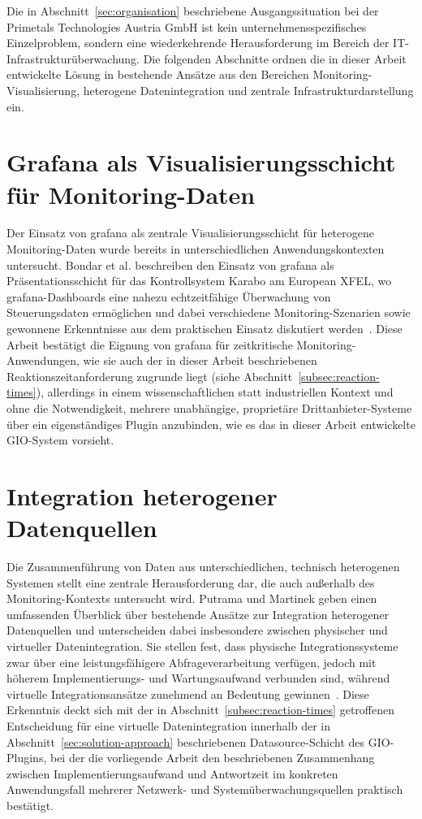 Die in Abschnitt~\ref{sec:organisation} beschriebene Ausgangssituation bei der Primetals
Technologies Austria GmbH ist kein unternehmensspezifisches Einzelproblem,
sondern eine wiederkehrende Herausforderung im Bereich der IT-Infrastrukturüberwachung. Die
folgenden Abschnitte ordnen die in dieser Arbeit entwickelte Lösung in bestehende Ansätze aus
den Bereichen Monitoring-Visualisierung, heterogene Datenintegration und zentrale
Infrastrukturdarstellung ein.

\section{Grafana als Visualisierungsschicht für Monitoring-Daten}
\label{sec:related-grafana}

Der Einsatz von \gls{grafana} als zentrale Visualisierungsschicht für heterogene
Monitoring-Daten wurde bereits in unterschiedlichen Anwendungskontexten untersucht.
Bondar et al. beschreiben den Einsatz von \gls{grafana} als Präsentationsschicht für das
Kontrollsystem Karabo am European XFEL, wo \gls{grafana}-Dashboards eine nahezu
echtzeitfähige Überwachung von Steuerungsdaten ermöglichen und dabei verschiedene
Monitoring-Szenarien sowie gewonnene Erkenntnisse aus dem praktischen Einsatz
diskutiert werden~\cite{VBondar2025}. Diese Arbeit bestätigt die Eignung von
\gls{grafana} für zeitkritische Monitoring-Anwendungen, wie sie auch der in dieser
Arbeit beschriebenen Reaktionszeitanforderung zugrunde liegt (siehe
Abschnitt~\ref{subsec:reaction-times}), allerdings in einem wissenschaftlichen statt
industriellen Kontext und ohne die Notwendigkeit, mehrere unabhängige, proprietäre
Drittanbieter-Systeme über ein eigenständiges Plugin anzubinden, wie es das in dieser
Arbeit entwickelte GIO-System vorsieht.

\section{Integration heterogener Datenquellen}
\label{sec:related-integration}

Die Zusammenführung von Daten aus unterschiedlichen, technisch heterogenen Systemen
stellt eine zentrale Herausforderung dar, die auch außerhalb des Monitoring-Kontexts
untersucht wird. Putrama und Martinek geben einen umfassenden Überblick über
bestehende Ansätze zur Integration heterogener Datenquellen und unterscheiden dabei
insbesondere zwischen physischer und virtueller Datenintegration. Sie stellen fest,
dass physische Integrationssysteme zwar über eine leistungsfähigere
Abfrageverarbeitung verfügen, jedoch mit höherem Implementierungs- und
Wartungsaufwand verbunden sind, während virtuelle Integrationsansätze zunehmend an
Bedeutung gewinnen~\cite{Putrama2024}. Diese Erkenntnis deckt sich mit der in
Abschnitt~\ref{subsec:reaction-times} getroffenen Entscheidung für eine virtuelle
Datenintegration innerhalb der in Abschnitt~\ref{sec:solution-approach} beschriebenen
Datasource-Schicht des GIO-Plugins, bei der die vorliegende Arbeit den beschriebenen
Zusammenhang zwischen Implementierungsaufwand und Antwortzeit im konkreten
Anwendungsfall mehrerer Netzwerk- und Systemüberwachungsquellen praktisch bestätigt.

